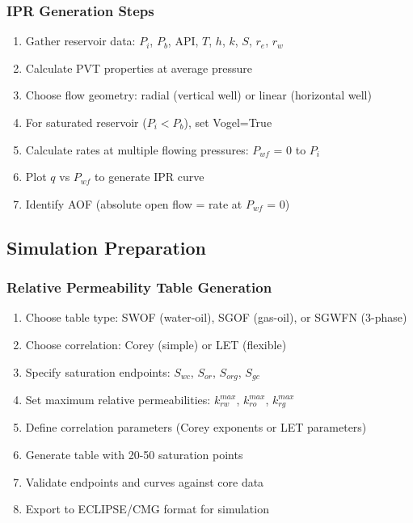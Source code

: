 \documentclass[11pt,a4paper]{article}
\begin{document}
\subsubsection{IPR Generation Steps}
\begin{enumerate}
\item Gather reservoir data: $P_i$, $P_b$, API, $T$, $h$, $k$, $S$, $r_e$, $r_w$
\item Calculate PVT properties at average pressure
\item Choose flow geometry: radial (vertical well) or linear (horizontal well)
\item For saturated reservoir ($P_i < P_b$), set Vogel=True
\item Calculate rates at multiple flowing pressures: $P_{wf}$ = 0 to $P_i$
\item Plot $q$ vs $P_{wf}$ to generate IPR curve
\item Identify AOF (absolute open flow = rate at $P_{wf}$ = 0)
\end{enumerate}

\subsection{Simulation Preparation}

\subsubsection{Relative Permeability Table Generation}
\begin{enumerate}
\item Choose table type: SWOF (water-oil), SGOF (gas-oil), or SGWFN (3-phase)
\item Choose correlation: Corey (simple) or LET (flexible)
\item Specify saturation endpoints: $S_{wc}$, $S_{or}$, $S_{org}$, $S_{gc}$
\item Set maximum relative permeabilities: $k_{rw}^{max}$, $k_{ro}^{max}$, $k_{rg}^{max}$
\item Define correlation parameters (Corey exponents or LET parameters)
\item Generate table with 20-50 saturation points
\item Validate endpoints and curves against core data
\item Export to ECLIPSE/CMG format for simulation
\end{enumerate}

\newpage

\end{document}
